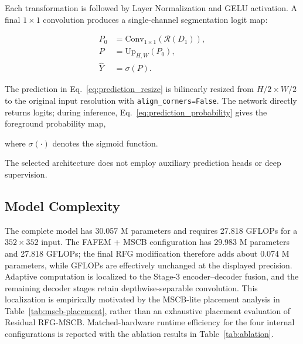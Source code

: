 Each transformation is followed by Layer Normalization and GELU activation. A final $1\times1$ convolution produces a single-channel segmentation logit map:

\begin{align}
P_0&=\mathrm{Conv}_{1\times1}\left(\mathcal{R}(D_1)\right),
\label{eq:prediction_logits}\\
P&=\mathrm{Up}_{H,W}(P_0),
\label{eq:prediction_resize}\\
\widehat{Y}&=\sigma(P).
\label{eq:prediction_probability}
\end{align}

The prediction in Eq.~\eqref{eq:prediction_resize} is bilinearly resized from $H/2\times W/2$ to the original input resolution with \texttt{align\_corners=False}. The network directly returns logits; during inference, Eq.~\eqref{eq:prediction_probability} gives the foreground probability map,

where $\sigma(\cdot)$ denotes the sigmoid function.

The selected architecture does not employ auxiliary prediction heads or deep supervision.

\subsection{Model Complexity}
\label{model-complexity}

The complete model has 30.057 M parameters and requires 27.818 GFLOPs for a
$352\times352$ input. The FAFEM + MSCB configuration has 29.983 M parameters
and 27.818 GFLOPs; the final RFG modification therefore adds about 0.074 M
parameters, while GFLOPs are effectively unchanged at the displayed precision.
Adaptive computation is localized to the Stage-3 encoder--decoder fusion, and the
remaining decoder stages retain depthwise-separable convolution. This localization is
empirically motivated by the MSCB-lite placement analysis in
Table~\ref{tab:mscb-placement}, rather than an exhaustive placement evaluation of
Residual RFG-MSCB. Matched-hardware
runtime efficiency for the four internal configurations is reported with the ablation
results in Table~\ref{tab:ablation}.

